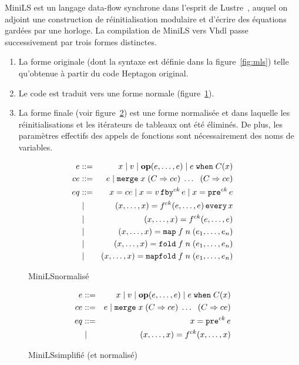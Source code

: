 \documentclass[a4paper]{article}
\newcommand{\LANG}{{\sc Heptagon}}
\newcommand{\lustre}{{\sc Lustre}}
\newcommand{\minils}{{\sc MiniLS}}
\newcommand{\vhdl}{{\sc Vhdl}}
\newcommand{\p}[0]{\; \vert \;}
\newcommand{\mybox}[1]{\mbox{\tt{#1}}}
\newcommand{\Coloneqq}[0]{::=}
\newcommand{\Op}[2]{\mybox{\bf{op}}(#1,\dots,#2)}
\newcommand{\Fby}[2]{#1 \, \mybox{fby}^{ck} \, #2}
\newcommand{\Pre}[1]{\mybox{pre}^{ck} \, #1}
\newcommand{\Every}[4]{#1^{ck}(#2,\dots,#3) \, \mybox{every} \, #4}
\newcommand{\App}[2]{#1^{ck}(#2)}
\newcommand{\When}[3]{#1 \; \mybox{when} \; #2(#3)}
\newcommand{\Merge}[5]{\mybox{merge} \; #1 \; (#2 \Rightarrow #3) \; \dots \; \
  (#4 \Rightarrow #5)}
\newcommand{\Map}[3]{\mathtt{map} \; #1\; n\; (#2,\dots,#3)}
\newcommand{\Fold}[3]{\mathtt{fold} \; #1\; n\; (#2,\dots,#3)}
\newcommand{\Mapfold}[3]{\mathtt{mapfold} \; #1\; n\; (#2,\dots,#3)}
\begin{document}
\minils{} est un langage data-flow synchrone dans l'esprit de
\lustre~\cite{lustre:ieee91}, auquel on adjoint une construction de
réinitialisation modulaire et d'écrire des équations gardées par une
horloge. La compilation de \minils{} vers \vhdl{} passe successivement
par trois formes distinctes.

\begin{enumerate}
\item La forme originale (dont la syntaxe est définie dans la figure~\ref{fig:mls}) telle
  qu'obtenue à partir du code \LANG{} original.
\item Le code est traduit vers une forme normale
  (figure~\ref{fig:mlsn}).
\item La forme finale (voir figure~\ref{fig:mlsns}) est une forme
normalisée et dans laquelle les réinitialisations et les itérateurs de tableaux
ont été éliminés. De plus, les paramètres effectifs des appels de fonctions
sont nécessairement des noms de variables.
\end{enumerate}

\begin{figure}[htp]
  \centering
  \begin{eqnarray*}
    e & \Coloneqq & x \p v \p \Op{e}{e} \p \When{e}{C}{x} \\
    ce & \Coloneqq & e \p \Merge{x}{C}{ce}{C}{ce} \\
    eq & \Coloneqq & x = ce \p x = \Fby{v}{e} \p x = \Pre{e} \\
    & \p & (x,\dots,x) = \Every{f}{e}{e}{x} \\
    & \p & (x,\dots,x) = \App{f}{e,\dots,e} \\
    & \p & (x,\dots,x) = \Map{f}{e_1}{e_n} \\
    & \p & (x,\dots,x) = \Fold{f}{e_1}{e_n} \\
    & \p & (x,\dots,x) = \Mapfold{f}{e_1}{e_n}
  \end{eqnarray*}
  \caption{\minils normalisé}
  \label{fig:mlsn}
\end{figure}

\begin{figure}[htp]
  \centering
  \begin{eqnarray*}
    e & \Coloneqq & x \p v \p \Op{e}{e} \p \When{e}{C}{x} \\
    ce & \Coloneqq & e \p \Merge{x}{C}{ce}{C}{ce} \\
    eq & \Coloneqq & x = \Pre{e} \\
    & \p & (x,\dots,x) = \App{f}{x,\dots,x}
  \end{eqnarray*}
  \caption{\minils simplifié (et normalisé)}
  \label{fig:mlsns}
\end{figure}
\end{document}
